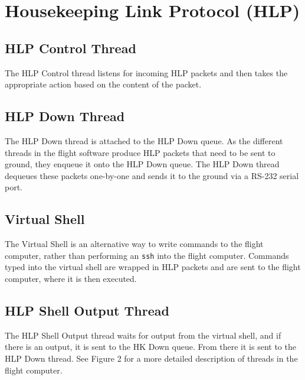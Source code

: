 %
\section{Housekeeping Link Protocol (HLP)}
\hrulefill
\subsection{HLP Control Thread}
The HLP Control thread listens for incoming HLP packets and then takes the appropriate action based on the content of the packet.

\subsection{HLP Down Thread}
The HLP Down thread is attached to the HLP Down queue. As the different threads in the flight software produce HLP packets that need to be sent to ground, they enqueue it onto the HLP Down queue. The HLP Down thread dequeues these packets one-by-one and sends it to the ground via a RS-232 serial port.

\subsection{Virtual Shell}
The Virtual Shell is an alternative way to write commands to the flight computer, rather than performing an \texttt{ssh} into the flight computer. Commands typed into the virtual shell are wrapped in HLP packets and are sent to the flight computer, where it is then executed.

\subsection{HLP Shell Output Thread}
The HLP Shell Output thread waits for output from the virtual shell, and if there is an output, it is sent to the HK Down queue. From there it is sent to the HLP Down thread. See Figure 2 for a more detailed description of threads in the flight computer.
